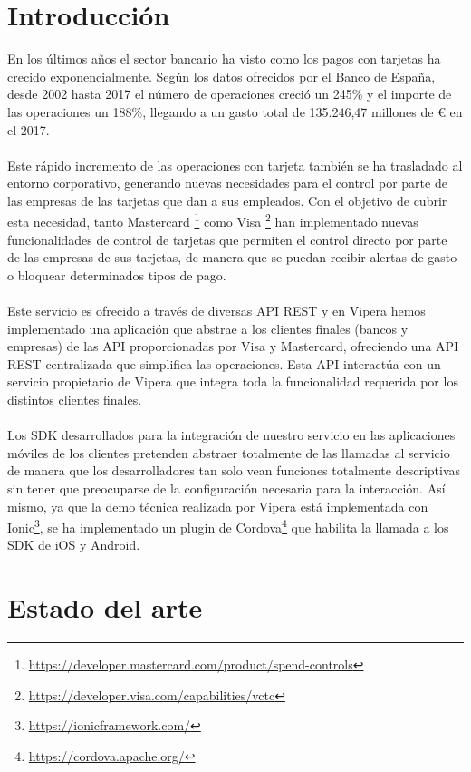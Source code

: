 \documentclass[a4paper, 12pt]{article}
\begin{document}
\section{Introducción}
\label{sec-1}
En los últimos años el sector bancario ha visto como los pagos con tarjetas ha crecido exponencialmente.
Según los datos ofrecidos por el Banco de España, desde 2002 hasta 2017 el número de operaciones creció
un 245\% y el importe de las operaciones un 188\%, llegando a un gasto total de 135.246,47 millones de €
en el 2017\cite{BancoEspana}.
\\
\\
Este rápido incremento de las operaciones con tarjeta también se ha trasladado al entorno corporativo,
generando nuevas necesidades para el control por parte de las empresas de las tarjetas que dan a sus
empleados. Con el objetivo de cubrir esta necesidad, tanto Mastercard \footnote{\url{https://developer.mastercard.com/product/spend-controls}} como Visa \footnote{\url{https://developer.visa.com/capabilities/vctc}} han
implementado nuevas funcionalidades de control de tarjetas que permiten el control directo por parte
de las empresas de sus tarjetas, de manera que se puedan recibir alertas de gasto o bloquear determinados tipos de pago.
\\
\\
Este servicio es ofrecido a través de diversas API REST y en Vipera hemos implementado una aplicación que
abstrae a los clientes finales (bancos y empresas) de las API proporcionadas por Visa y Mastercard,
ofreciendo una API REST centralizada que simplifica las operaciones. Esta API interactúa con un servicio
propietario de Vipera que integra toda la funcionalidad requerida por los distintos clientes finales.
\\
\\
Los SDK desarrollados para la integración de nuestro servicio en las aplicaciones móviles de los clientes
pretenden abstraer totalmente de las llamadas al servicio de manera que los desarrolladores tan solo
vean funciones totalmente descriptivas sin tener que preocuparse de la configuración necesaria para la
interacción. Así mismo, ya que la demo técnica realizada por Vipera está implementada con Ionic\footnote{\url{https://ionicframework.com/}},
se ha implementado un plugin de Cordova\footnote{\url{https://cordova.apache.org/}} que habilita la llamada a los SDK de iOS y Android.

\section{Estado del arte}
\label{sec-2}
\end{document}
